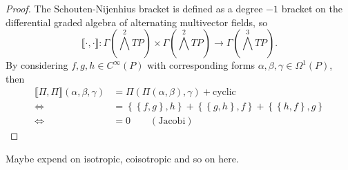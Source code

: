 % 
\begin{proof}
    The Schouten-Nijenhius bracket is defined as a degree $-1$ bracket on the differential graded algebra of alternating multivector fields, so
    \begin{equation}
        \llbracket \cdot, \cdot \rrbracket : \Gamma( \bigwedge^2 TP) \times \Gamma( \bigwedge^2 TP) \rightarrow \Gamma( \bigwedge^3 TP).
    \end{equation}
    By considering $f,g,h \in C^\infty(P)$ with corresponding forms $\alpha,\beta, \gamma \in  \Omega^1(P)$, then
    \begin{align*}
        \llbracket \Pi, \Pi\rrbracket(\alpha, \beta, \gamma) &= \Pi( \Pi(\alpha, \beta), \gamma) + \mathrm{cyclic} \\
        \Leftrightarrow \qquad \qquad  &= \left\{\left\{  f,g\right\}, h  \right\} 
        + \left\{ \left\{ g,h \right\},f \right\}
        + \left\{  \left\{ h,f \right\},g \right\} \\
        \Leftrightarrow \qquad \qquad &=0 \quad \quad \mathrm{(Jacobi )}
    \end{align*}
    
\end{proof}
% 
% 
\label{def:hamiltonian_distribution}

Maybe expend on isotropic, coisotropic and so on here.

